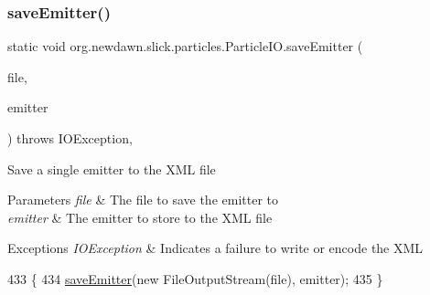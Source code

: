 \subsubsection{\texorpdfstring{save\+Emitter()}{saveEmitter()}\hspace{0.1cm}{\footnotesize\ttfamily [1/2]}}
{\footnotesize\ttfamily static void org.\+newdawn.\+slick.\+particles.\+Particle\+I\+O.\+save\+Emitter (\begin{DoxyParamCaption}\item[{File}]{file,  }\item[{\mbox{\hyperlink{classorg_1_1newdawn_1_1slick_1_1particles_1_1_configurable_emitter}{Configurable\+Emitter}}}]{emitter }\end{DoxyParamCaption}) throws I\+O\+Exception\hspace{0.3cm}{\ttfamily [inline]}, {\ttfamily [static]}}

Save a single emitter to the X\+ML file


\begin{DoxyParams}{Parameters}
{\em file} & The file to save the emitter to \\
\hline
{\em emitter} & The emitter to store to the X\+ML file \\
\hline
\end{DoxyParams}

\begin{DoxyExceptions}{Exceptions}
{\em I\+O\+Exception} & Indicates a failure to write or encode the X\+ML \\
\hline
\end{DoxyExceptions}

\begin{DoxyCode}
433                                \{
434         \mbox{\hyperlink{classorg_1_1newdawn_1_1slick_1_1particles_1_1_particle_i_o_a38e0daafdd03fa48eb938576567fc4cc}{saveEmitter}}(\textcolor{keyword}{new} FileOutputStream(file), emitter);
435     \}
\end{DoxyCode}
\mbox{\label{classorg_1_1newdawn_1_1slick_1_1particles_1_1_particle_i_o_ade7a5c9c444703fbbc463683aba9148a}} 
